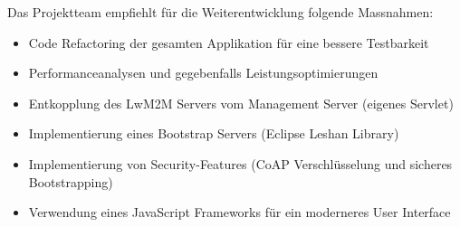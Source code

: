 Das Projektteam empfiehlt für die Weiterentwicklung folgende Massnahmen:
\begin{itemize}
\item Code Refactoring der gesamten Applikation für eine bessere Testbarkeit
\item Performanceanalysen und gegebenfalls Leistungsoptimierungen
\item Entkopplung des LwM2M Servers vom Management Server (eigenes Servlet)
\item Implementierung eines Bootstrap Servers (Eclipse Leshan Library)
\item Implementierung von Security-Features (CoAP Verschlüsselung und sicheres Bootstrapping)
\item Verwendung eines JavaScript Frameworks für ein moderneres User Interface
\end{itemize}
\newpage